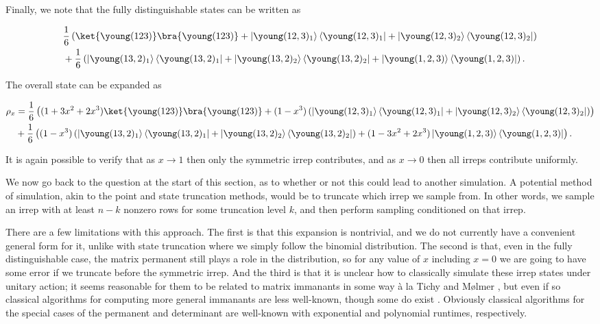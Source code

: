 Finally, we note that the fully distinguishable states can be written as

\begin{align}
&\frac{1}{6}\left(\ket{\young(123)}\bra{\young(123)} + \left|\young(12,3)_1\right\rangle\left\langle\young(12,3)_1\right| + \left|\young(12,3)_2\right\rangle\left\langle\young(12,3)_2\right|\right)\nonumber\\
&+\frac{1}{6}\left(\left|\young(13,2)_1\right\rangle\left\langle\young(13,2)_1\right| + \left|\young(13,2)_2\right\rangle\left\langle\young(13,2)_2\right| + \left|\young(1,2,3)\right\rangle\left\langle\young(1,2,3)\right|\right).
\end{align}

The overall state can be expanded as

\begin{align}
\rho_x &= \frac{1}{6}\left((1+3x^2+2x^3)\ket{\young(123)}\bra{\young(123)} + (1-x^3)\left(\left|\young(12,3)_1\right\rangle\left\langle\young(12,3)_1\right| + \left|\young(12,3)_2\right\rangle\left\langle\young(12,3)_2\right|\right)\right)\nonumber\\
&+\frac{1}{6}\left((1-x^3)\left(\left|\young(13,2)_1\right\rangle\left\langle\young(13,2)_1\right| + \left|\young(13,2)_2\right\rangle\left\langle\young(13,2)_2\right|\right) + (1-3x^2+2x^3)\left|\young(1,2,3)\right\rangle\left\langle\young(1,2,3)\right|\right).
\end{align}

It is again possible to verify that as $x\rightarrow 1$ then only the symmetric irrep contributes, and as $x \rightarrow 0$ then all irreps contribute uniformly.

We now go back to the question at the start of this section, as to whether or not this could lead to another simulation. A potential method of simulation, akin to the point and state truncation methods, would be to truncate which irrep we sample from. In other words, we sample an irrep with at least $n-k$ nonzero rows for some truncation level $k$, and then perform sampling conditioned on that irrep.

There are a few limitations with this approach. The first is that this expansion is nontrivial, and we do not currently have a convenient general form for it, unlike with state truncation where we simply follow the binomial distribution. The second is that, even in the fully distinguishable case, the matrix permanent still plays a role in the distribution, so for any value of $x$ including $x=0$ we are going to have some error if we truncate before the symmetric irrep. And the third is that it is unclear how to classically simulate these irrep states under unitary action; it seems reasonable for them to be related to matrix immanants in some way \`{a} la Tichy and M\o lmer \cite{tichy2017}, but even if so classical algorithms for computing more general immanants are less well-known, though some do exist \cite{hartmann1985, barvinok1990, burgisser2000}. Obviously classical algorithms for the special cases of the permanent and determinant are well-known with exponential \cite{glynn2010} and polynomial \cite{fisikopoulos2016} runtimes, respectively.

